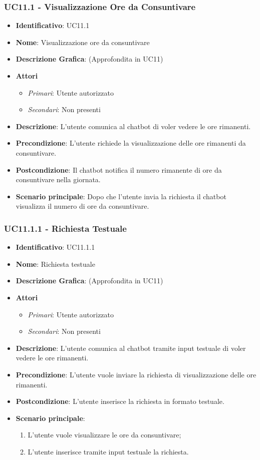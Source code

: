 \subsubsection{UC11.1 - Visualizzazione Ore da Consuntivare}
\begin{itemize}
	\item \textbf{Identificativo}: UC11.1
	\item \textbf{Nome}: Visualizzazione ore da consuntivare
	\item \textbf{Descrizione Grafica}: (Approfondita in UC11)
	\item \textbf{Attori}
	\begin{itemize} 
		\item \textit{Primari}: Utente autorizzato
		\item \textit{Secondari}: Non presenti
	\end{itemize}
	\item \textbf{Descrizione}: L'utente comunica al chatbot di voler vedere le ore rimanenti.
	\item \textbf{Precondizione}: L'utente richiede la visualizzazione delle ore rimanenti da consuntivare.
	\item \textbf{Postcondizione}: Il chatbot notifica il numero rimanente di ore da consuntivare nella giornata.
	\item \textbf{Scenario principale}: Dopo che l'utente invia la richiesta il chatbot visualizza il numero di ore da consuntivare.
\end{itemize}

\subsubsection{UC11.1.1 - Richiesta Testuale}
\begin{itemize}
	\item \textbf{Identificativo}: UC11.1.1
	\item \textbf{Nome}: Richiesta testuale
	\item \textbf{Descrizione Grafica}: (Approfondita in UC11)
	\item \textbf{Attori}
	\begin{itemize} 
		\item \textit{Primari}: Utente autorizzato
		\item \textit{Secondari}: Non presenti
	\end{itemize}
	\item \textbf{Descrizione}: L'utente comunica al chatbot tramite input testuale di voler vedere le ore rimanenti.
	\item \textbf{Precondizione}: L'utente vuole inviare la richiesta di visualizzazione delle ore rimanenti.
	\item \textbf{Postcondizione}: L'utente inserisce la richiesta in formato testuale.
	\item \textbf{Scenario principale}:
	\begin{enumerate}
		\item L'utente vuole visualizzare le ore da consuntivare;
		\item L'utente inserisce tramite input testuale la richiesta.
	\end{enumerate}
\end{itemize}

